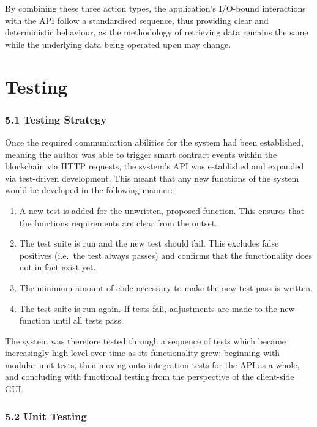 \documentclass[12pt]{report}
\providecommand{\tightlist}{%
  \setlength{\itemsep}{0pt}\setlength{\parskip}{0pt}}
\begin{document}
By combining these three action types, the application's I/O-bound
interactions with the API follow a standardised sequence, thus providing
clear and deterministic behaviour, as the methodology of retrieving data
remains the same while the underlying data being operated upon may
change.

\chapter{Testing}

\subsection{5.1 Testing Strategy}\label{testing-strategy}

Once the required communication abilities for the system had been
established, meaning the author was able to trigger smart contract
events within the blockchain via HTTP requests, the system's API was
established and expanded via test-driven development. This meant that
any new functions of the system would be developed in the following
manner\cite{beck2003test}:

\begin{enumerate}
\def\labelenumi{\arabic{enumi}.}
\tightlist
\item
  A new test is added for the unwritten, proposed function. This ensures
  that the functions requirements are clear from the outset.
\item
  The test suite is run and the new test should fail. This excludes
  false positives (i.e.~the test always passes) and confirms that the
  functionality does not in fact exist yet.
\item
  The minimum amount of code necessary to make the new test pass is
  written.
\item
  The test suite is run again. If tests fail, adjustments are made to
  the new function until all tests pass.
\end{enumerate}

The system was therefore tested through a sequence of tests which became
increasingly high-level over time as its functionality grew; beginning
with modular unit tests, then moving onto integration tests for the API
as a whole, and concluding with functional testing from the perspective
of the client-side GUI.

\subsection{5.2 Unit Testing}\label{unit-testing}
\end{document}
